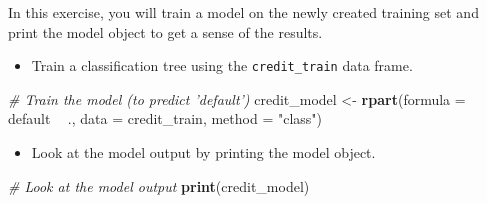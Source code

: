 \documentclass[
]{book}
\newenvironment{Shaded}{\begin{snugshade}}{\end{snugshade}}
\newcommand{\CommentTok}[1]{\textcolor[rgb]{0.56,0.35,0.01}{\textit{#1}}}
\newcommand{\DataTypeTok}[1]{\textcolor[rgb]{0.13,0.29,0.53}{#1}}
\newcommand{\KeywordTok}[1]{\textcolor[rgb]{0.13,0.29,0.53}{\textbf{#1}}}
\newcommand{\NormalTok}[1]{#1}
\newcommand{\OperatorTok}[1]{\textcolor[rgb]{0.81,0.36,0.00}{\textbf{#1}}}
\newcommand{\StringTok}[1]{\textcolor[rgb]{0.31,0.60,0.02}{#1}}
\providecommand{\tightlist}{%
  \setlength{\itemsep}{0pt}\setlength{\parskip}{0pt}}
\begin{document}
In this exercise, you will train a model on the newly created training set and print the model object to get a sense of the results.

\begin{itemize}
\tightlist
\item
  Train a classification tree using the \texttt{credit\_train} data frame.
\end{itemize}

\begin{Shaded}
\begin{Highlighting}[]
\CommentTok{# Train the model (to predict 'default')}
\NormalTok{credit_model <-}\StringTok{ }\KeywordTok{rpart}\NormalTok{(}\DataTypeTok{formula =}\NormalTok{ default }\OperatorTok{~}\StringTok{ }\NormalTok{., }
                      \DataTypeTok{data =}\NormalTok{ credit_train, }
                      \DataTypeTok{method =} \StringTok{"class"}\NormalTok{)}
\end{Highlighting}
\end{Shaded}

\begin{itemize}
\tightlist
\item
  Look at the model output by printing the model object.
\end{itemize}

\begin{Shaded}
\begin{Highlighting}[]
\CommentTok{# Look at the model output                      }
\KeywordTok{print}\NormalTok{(credit_model)}
\end{Highlighting}
\end{Shaded}
\end{document}
